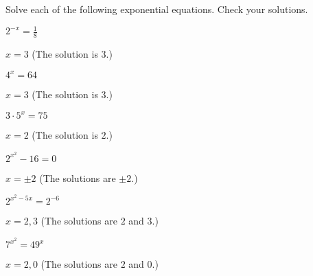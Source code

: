 \begin{exercises}
\begin{problem}
Solve each of the following exponential equations. Check your solutions. 
\begin{multicols}{3}
	\begin{subproblem}
		$2^{-x}=\frac{1}{8}$
		\begin{shortsolution}
			$x=3$ (The solution is $3$.)
		\end{shortsolution}
	\end{subproblem}
	\begin{subproblem}
		$4^x=64$
		\begin{shortsolution}
			$x=3$ (The solution is $3$.)
		\end{shortsolution}
	\end{subproblem}
	\begin{subproblem}
		$3\cdot 5^x=75$
		\begin{shortsolution}
			$x=2$ (The solution is $2$.)
		\end{shortsolution}
	\end{subproblem}
	\begin{subproblem}
		$2^{x^2}-16=0$
		\begin{shortsolution}
			$x=\pm 2$ (The solutions are $\pm 2$.)
		\end{shortsolution}
	\end{subproblem}
	\begin{subproblem}
		$2^{x^2-5x}=2^{-6}$
		\begin{shortsolution}
			$x=2,3$ (The solutions are $2$ and $3$.)
		\end{shortsolution}
	\end{subproblem}
	\begin{subproblem}
		$7^{x^2}=49^{x}$
		\begin{shortsolution}
			$x=2,0$ (The solutions are $2$ and $0$.)
		\end{shortsolution}
	\end{subproblem}
\end{multicols}
\end{problem}


\end{exercises}
